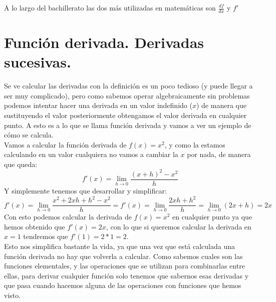 \documentclass[a4paper,11pt,answers]{exam}
\begin{document}
A lo largo del bachillerato las dos más utilizadas en matemáticas son $\frac{df}{dx}$ y $f'$


\section{Función derivada. Derivadas sucesivas.}
Se ve calcular las derivadas con la definición es un poco tedioso (y puede llegar a ser muy complicado), pero como sabemos operar algebraicamente sin problemas podemos intentar hacer una derivada en un valor indefinido ($x$) de manera que sustituyendo el valor posteriormente obtengamos el valor derivada en cualquier punto. A esto es a lo que se llama función derivada y vamos a ver un ejemplo de cómo se calcula.\\

Vamos a calcular la función derivada de $f(x) = x^2$, y como la estamos calculando en un valor cualquiera no vamos a cambiar la $x$ por nada, de manera que queda:
\[f'(x) = \lim_{h \to 0} \frac{(x+h)^2 - x^2}{h}\]
Y simplemente tenemos que desarrollar y simplificar:
\[f'(x) = \lim_{h \to 0} \frac{x^2 + 2xh + h^2 - x^2}{h} = f'(x) = \lim_{h \to 0} \frac{2xh + h^2}{h} =
\lim_{h \to 0} (2x + h) = 2x\]
Con esto podemos calcular la derivada de $f(x) = x^2$ en cualquier punto ya que hemos obtenido que $f'(x) = 2x$, con lo que si queremos calcular la derivada en $x=1$ tendremos que $f'(1) = 2*1 = 2$.\\

Esto nos simplifica bastante la vida, ya que una vez que está calculada una función derivada no hay que volverla a calcular. Como sabemos cuales son las funciones elementales, y las operaciones que se utilizan para combinarlas entre ellas, para derivar cualquier función solo tenemos que sabernos esas derivadas y que pasa cuando hacemos alguna de las operaciones con funciones que hemos visto.
\end{document}
